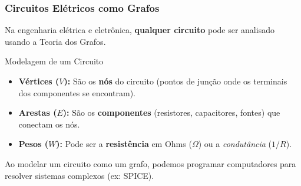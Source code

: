 \documentclass[9pt]{beamer}
\begin{document}
\begin{frame}
    \frametitle{Circuitos Elétricos como Grafos}
    Na engenharia elétrica e eletrônica, \textbf{qualquer circuito} pode ser analisado usando a Teoria dos Grafos.
    \vspace{0.5cm}
    \begin{block}{Modelagem de um Circuito}
        \begin{itemize}
            \item \textbf{Vértices ($V$):} São os \textbf{nós} do circuito (pontos de junção onde os terminais dos componentes se encontram).
            \item \textbf{Arestas ($E$):} São os \textbf{componentes} (resistores, capacitores, fontes) que conectam os nós.
            \item \textbf{Pesos ($W$):} Pode ser a \textbf{resistência} em Ohms ($\Omega$) ou a \textit{condutância} ($1/R$).
        \end{itemize}
    \end{block}
    \vspace{0.3cm}
    Ao modelar um circuito como um grafo, podemos programar computadores para resolver sistemas complexos (ex: SPICE).
\end{frame}
\end{document}
